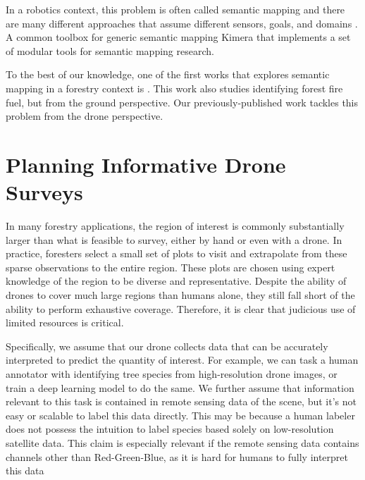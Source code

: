 In a robotics context, this problem is often called semantic mapping and there are many different approaches that assume different sensors, goals, and domains \cite{Kostavelis2015SemanticSurvey}.
A common toolbox for generic semantic mapping Kimera \cite{Rosinol2020} that implements a set of modular tools for semantic mapping research. 

To the best of our knowledge, one of the first works that explores semantic mapping in a forestry context is \cite{Andrada2022IntegrationRoboticsb}. This work also studies identifying forest fire fuel, but from the ground perspective. Our previously-published work \cite{RussellUnmannedMitigation} tackles this problem from the drone perspective.


\section{Planning Informative Drone Surveys}

In many forestry applications, the region of interest is commonly substantially larger than what is feasible to survey, either by hand or even with a drone. In practice, foresters  select a small set of plots to visit and extrapolate from these sparse observations to the entire region. These plots are chosen using expert knowledge of the region to be diverse and representative. Despite the ability of drones to cover much large regions than humans alone, they still fall short of the ability to perform  exhaustive coverage. Therefore, it is clear that judicious use of limited resources is critical.


Specifically, we assume that our drone collects data that can be accurately interpreted to predict the quantity of interest. For example, we can task a human annotator with identifying tree species from high-resolution drone images, or train a deep learning model to do the same. We further assume that information relevant to this task is contained in remote sensing data of the scene, but it's not easy or scalable to label this data directly. This may be because a human labeler does not possess the intuition to label species based solely on low-resolution satellite data. This claim is especially relevant if the remote sensing data contains channels other than Red-Green-Blue, as it is hard for humans to fully interpret this data 

